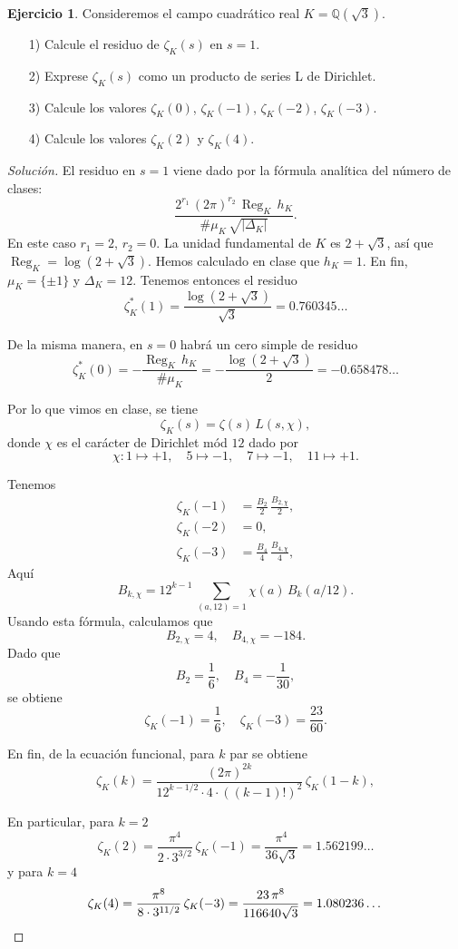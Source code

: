 \documentclass{article}
\theoremstyle{definition}
\newtheorem{ejercicio}{Ejercicio}
\newenvironment{solucion}{\begin{proof}[Solución]}{\end{proof}}
\DeclareMathOperator{\Reg}{Reg}
\newcommand{\QQ}{\mathbb{Q}}
\begin{document}
\begin{ejercicio}
  Consideremos el campo cuadrático real $K = \QQ (\sqrt{3})$.
  \begin{enumerate}
  \item[1)] Calcule el residuo de $\zeta_K (s)$ en $s = 1$.

  \item[2)] Exprese $\zeta_K (s)$ como un producto de series L de Dirichlet.

  \item[3)] Calcule los valores
    $\zeta_K (0)$, $\zeta_K (-1)$, $\zeta_K (-2)$, $\zeta_K (-3)$.

  \item[4)] Calcule los valores $\zeta_K (2)$ y $\zeta_K (4)$.
  \end{enumerate}

  \ifdefined\solutions
  \begin{solucion}
    El residuo en $s = 1$ viene dado por la fórmula analítica del número de
    clases:
    $$\frac{2^{r_1}\,(2\pi)^{r_2}\,\Reg_K\,h_K}{\# \mu_K \, \sqrt{|\Delta_K|}}.$$
    En este caso $r_1 = 2$, $r_2 = 0$. La unidad fundamental de $K$ es
    $2 + \sqrt{3}$, así que $\Reg_K = \log (2 + \sqrt{3})$. Hemos calculado en
    clase que $h_K = 1$. En fin, $\mu_K = \{ \pm 1 \}$ y
    $\Delta_K = 12$. Tenemos entonces el residuo
    $$\zeta_K^* (1) = \frac{\log (2 + \sqrt{3})}{\sqrt{3}} = 0.760345\ldots$$

    De la misma manera, en $s = 0$ habrá un cero simple de residuo
    $$\zeta_K^* (0) = -\frac{\Reg_K\,h_K}{\# \mu_K} = -\frac{\log (2+\sqrt{3})}{2} = -0.658478\ldots$$

    Por lo que vimos en clase, se tiene
    $$\zeta_K (s) = \zeta (s)\,L(s,\chi),$$
    donde $\chi$ es el carácter de Dirichlet mód $12$ dado por
    $$\chi\colon 1\mapsto +1, \quad 5 \mapsto -1, \quad 7 \mapsto -1, \quad 11 \mapsto +1.$$

    Tenemos
    \begin{align*}
      \zeta_K (-1) & = \frac{B_2}{2}\,\frac{B_{2,\chi}}{2}, \\
      \zeta_K (-2) & = 0, \\
      \zeta_K (-3) & = \frac{B_4}{4}\,\frac{B_{4,\chi}}{4},
    \end{align*}
    Aquí
    $$B_{k,\chi} = 12^{k-1} \, \sum_{(a,12)=1} \chi (a) \, B_k (a/12).$$
    Usando esta fórmula, calculamos que
    $$B_{2,\chi} = 4, \quad B_{4,\chi} = -184.$$
    Dado que
    $$B_2 = \frac{1}{6}, \quad B_4 = -\frac{1}{30},$$
    se obtiene
    $$\zeta_K (-1) = \frac{1}{6}, \quad \zeta_K (-3) = \frac{23}{60}.$$

    En fin, de la ecuación funcional, para $k$ par se obtiene
    $$\zeta_K (k) = \frac{(2\pi)^{2k}}{12^{k - 1/2}\cdot 4\cdot ((k-1)!)^2}\,\zeta_K (1-k),$$

    En particular, para $k = 2$
    \[ \zeta_K (2) = \frac{\pi^4}{2\cdot 3^{3/2}}\,\zeta_K (-1) =
      \frac{\pi^4}{36\sqrt{3}} =
      1.562199\ldots \]
    y para $k = 4$
    \[ \zeta_K (4) = \frac{\pi^8}{8\cdot 3^{11/2}}\,\zeta_K (-3) =
      \frac{23\,\pi^8}{116640\sqrt{3}} =
      1.080236\ldots \qedhere \]
  \end{solucion}
  \fi
\end{ejercicio}
\end{document}
